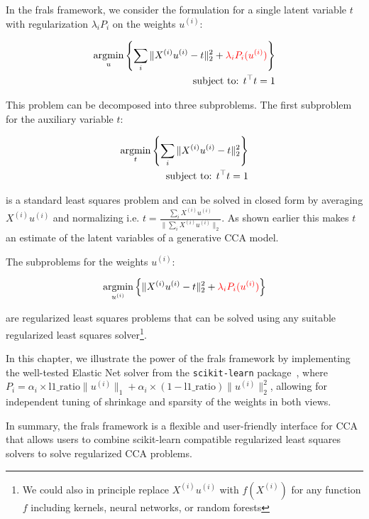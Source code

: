 In the \acrshort{frals} framework, we consider the formulation for a single latent variable \(t\) with regularization \(\lambda_i P_i\) on the weights \(u^{(i)}\):

\begin{align}
    \underset{u}{\mathrm{argmin}}\left\{\sum_i \|X^{(i)} u^{(i)} - t\|_2^2 + \textcolor{red}{\lambda_i P_i(u^{(i)})} \right\}\\
    \text{subject to: }t^\top t = 1 \notag
\end{align}

This problem can be decomposed into three subproblems.
The first subproblem for the auxiliary variable \(t\):

\begin{align}
    \underset{t}{\mathrm{argmin}}\left\{\sum_i \|X^{(i)} u^{(i)} - t\|_2^2\right\}\\
    \text{subject to: }t^\top t = 1 \notag
\end{align}

is a standard least squares problem and can be solved in closed form by averaging \(X^{(i)} u^{(i)}\) and normalizing i.e. \(t = \frac{\sum_i X^{(i)} u^{(i)}}{\|\sum_i X^{(i)} u^{(i)}\|_2}\).
As shown earlier this makes \(t\) an estimate of the latent variables of a generative CCA model.

The subproblems for the weights \(u^{(i)}\):

\begin{align}
    \underset{u^{(i)}}{\mathrm{argmin}}\left\{\|X^{(i)} u^{(i)} - t\|_2^2 + \textcolor{red}{\lambda_i P_i(u^{(i)})} \right\}
\end{align}

are regularized least squares problems that can be solved using any suitable regularized least squares solver\footnote{We could also in principle replace $X^{(i)} u^{(i)}$ with $f(X^{(i)})$ for any function $f$ including kernels, neural networks, or random forests}.

In this chapter, we illustrate the power of the \acrshort{frals} framework by implementing the well-tested Elastic Net solver from the \texttt{scikit-learn} package~\citep{pedregosa2011scikit}, where \(P_i = \alpha_i \times \text{l1\_ratio} \|u^{(i)}\|_1 + \alpha_i \times (1-\text{l1\_ratio}) \|u^{(i)}\|_2^2\), allowing for independent tuning of shrinkage and sparsity of the weights in both views.

In summary, the \acrshort{frals} framework is a flexible and user-friendly interface for CCA that allows users to combine scikit-learn compatible regularized least squares solvers to solve regularized CCA problems.


